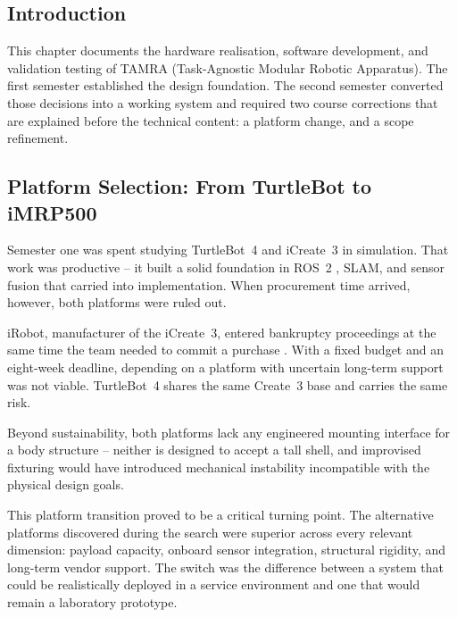 
\subsection{Introduction}

This chapter documents the hardware realisation, software development, and validation testing of TAMRA (Task-Agnostic Modular Robotic Apparatus). The first semester established the design foundation. The second semester converted those decisions into a working system and required two course corrections that are explained before the technical content: a platform change, and a scope refinement.

\subsection{Platform Selection: From TurtleBot to iMRP500}

Semester one was spent studying TurtleBot~4 and iCreate~3 in simulation. That work was productive -- it built a solid foundation in ROS~2 \cite{macenski2022ros2}, SLAM, and sensor fusion that carried into implementation. When procurement time arrived, however, both platforms were ruled out.

iRobot, manufacturer of the iCreate~3, entered bankruptcy proceedings at the same time the team needed to commit a purchase \cite{irobot2024create3}. With a fixed budget and an eight-week deadline, depending on a platform with uncertain long-term support was not viable. TurtleBot~4 shares the same Create~3 base and carries the same risk.

Beyond sustainability, both platforms lack any engineered mounting interface for a body structure -- neither is designed to accept a tall shell, and improvised fixturing would have introduced mechanical instability incompatible with the physical design goals.

This platform transition proved to be a critical turning point. The alternative platforms discovered during the search were superior across every relevant dimension: payload capacity, onboard sensor integration, structural rigidity, and long-term vendor support. The switch was the difference between a system that could be realistically deployed in a service environment and one that would remain a laboratory prototype.

